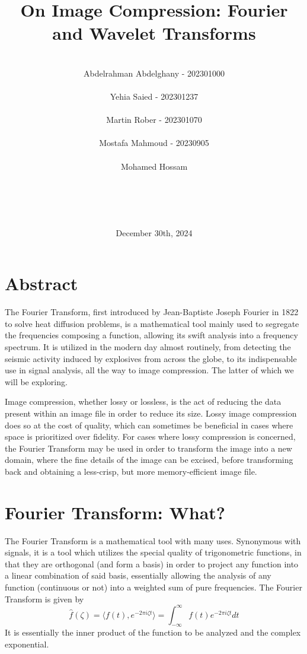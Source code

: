 \documentclass{article}
\title{On Image Compression: Fourier and Wavelet Transforms}
\author{ \\ Abdelrahman Abdelghany - 202301000 \\ \\ Yehia Saied - 202301237 \\ \\ Martin Rober - 202301070 \\ \\ Mostafa Mahmoud - 20230905 \\ \\ Mohamed Hossam \\ \\ \\ \\ \\  }
\date{December 30th, 2024}
\begin{document}
\maketitle

\newpage
\section*{Abstract}
The Fourier Transform, first introduced by Jean-Baptiste Joseph Fourier in 1822 to solve heat diffusion problems, 
is a mathematical tool mainly used to segregate the frequencies composing a function, allowing its swift analysis 
into a frequency spectrum. It is utilized in the modern day almost routinely, from detecting the seismic activity 
induced by explosives from across the globe, to its indispensable use in signal analysis, all the way to image 
compression. The latter of which we will be exploring.

Image compression, whether lossy or lossless, is the act of reducing the data present within an image file in order 
to reduce its size. Lossy image compression does so at the cost of quality, which can sometimes be beneficial in 
cases where space is prioritized over fidelity. For cases where lossy compression is concerned, the Fourier 
Transform may be used in order to transform the image into a new domain, where the fine details of the image 
can be excised, before transforming back and obtaining a less-crisp, but more memory-efficient image file.

\newpage
\section*{Fourier Transform: What?}
The Fourier Transform is a mathematical tool with many uses. Synonymous with signals, it is a tool which 
utilizes the special quality of trigonometric functions, in that they are orthogonal (and form a basis) in 
order to project any function into a linear combination of said basis, essentially allowing the analysis of
any function (continuous or not) into a weighted sum of pure frequencies.
\newline \newline
The Fourier Transform is given by
$$\hat{f}(\zeta) = \langle f(t), e^{-2\pi i \zeta t} \rangle = \int_{-\infty}^{\infty} f(t) e^{-2\pi i \zeta t} dt$$
It is essentially the inner product of the function to be analyzed and the complex exponential.
\end{document}
